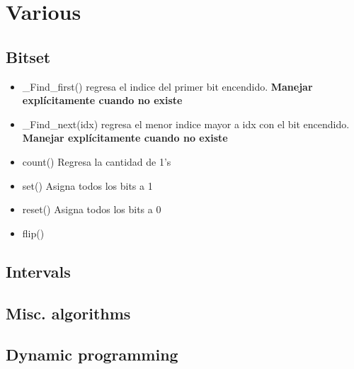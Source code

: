\chapter{Various}

\section{Bitset}

\begin{itemize}
    \item \_Find\_first() regresa el indice del primer bit encendido. \textbf{Manejar explícitamente cuando no existe}
    \item \_Find\_next(idx) regresa el menor indice mayor a idx con el bit encendido. \textbf{Manejar explícitamente cuando no existe}
    \item count() Regresa la cantidad de 1's
    \item set() Asigna todos los bits a 1
    \item reset() Asigna todos los bits a 0
    \item flip()
\end{itemize}

\section{Intervals}

\section{Misc. algorithms}

\section{Dynamic programming}



